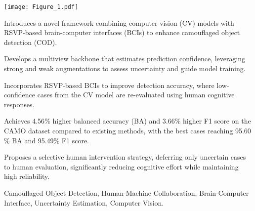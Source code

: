 \documentclass[preprint,12pt,authoryear]{elsarticle}
\begin{document}
\begin{frontmatter}
\begin{graphicalabstract}
\texttt{[image: Figure\_1.pdf]}
\end{graphicalabstract}

\begin{highlights}
\item Introduces a novel framework combining computer vision (CV) models with RSVP-based brain-computer interfaces (BCIs) to enhance camouflaged object detection (COD).
\item Develops a multiview backbone that estimates prediction confidence, leveraging strong and weak augmentations to assess uncertainty and guide model training.
\item Incorporates RSVP-based BCIs to improve detection accuracy, where low-confidence cases from the CV model are re-evaluated using human cognitive responses.
\item Achieves 4.56$\%$ higher balanced accuracy (BA) and 3.66$\%$ higher F1 score on the CAMO dataset compared to existing methods, with the best cases reaching 95.60$\%$ BA and 95.49$\%$ F1 score.
\item Proposes a selective human intervention strategy, deferring only uncertain cases to human evaluation, significantly reducing cognitive effort while maintaining high reliability.
\end{highlights}

\begin{keyword}
Camouflaged Object Detection, Human-Machine Collaboration, Brain-Computer Interface, Uncertainty Estimation, Computer Vision.
\end{keyword}



\end{frontmatter}
\end{document}
